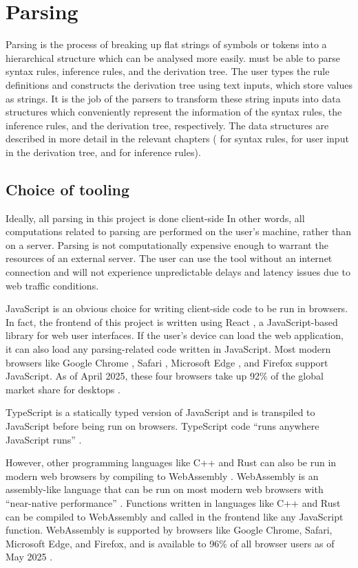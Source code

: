 \section{Parsing}
\label{background:parsing}
Parsing is the process of breaking up flat strings of symbols or tokens into a hierarchical structure which can be analysed more easily. \projectname{} must be able to parse syntax rules, inference rules, and the derivation tree. The user types the rule definitions and constructs the derivation tree using text inputs, which store values as strings. It is the job of the parsers to transform these string inputs into data structures which conveniently represent the information of the syntax rules, the inference rules, and the derivation tree, respectively. The data structures are described in more detail in the relevant chapters ( for syntax rules,  for user input in the derivation tree, and  for inference rules).

\subsection{Choice of tooling}
Ideally, all parsing in this project is done client-side In other words, all computations related to parsing are performed on the user's machine, rather than on a server. Parsing is not computationally expensive enough to warrant the resources of an external server. The user can use the tool without an internet connection and will not experience unpredictable delays and latency issues due to web traffic conditions.

JavaScript \cite{javascript} is an obvious choice for writing client-side code to be run in browsers. In fact, the frontend of this project is written using React \cite{react}, a JavaScript-based library for web user interfaces. If the user's device can load the web application, it can also load any parsing-related code written in JavaScript. Most modern browsers like Google Chrome \cite{chrome}, Safari \cite{safari}, Microsoft Edge \cite{edge}, and Firefox \cite{firefox} support JavaScript. As of April 2025, these four browsers take up 92\% of the global market share for desktops \cite{statcounter}.

TypeScript \cite{typescript} is a statically typed version of JavaScript and is transpiled to JavaScript before being run on browsers. TypeScript code ``runs anywhere JavaScript runs'' \cite{typescript}.

However, other programming languages like C++ and Rust can also be run in modern web browsers by compiling to WebAssembly \cite{webassembly}. WebAssembly is an assembly-like language that can be run on most modern web browsers with ``near-native performance'' \cite{webassembly}. Functions written in languages like C++ and Rust can be compiled to WebAssembly and called in the frontend like any JavaScript function. WebAssembly is supported by browsers like Google Chrome, Safari, Microsoft Edge, and Firefox, and is available to 96\% of all browser users as of May 2025 \cite{webassembly:caniuse}.

